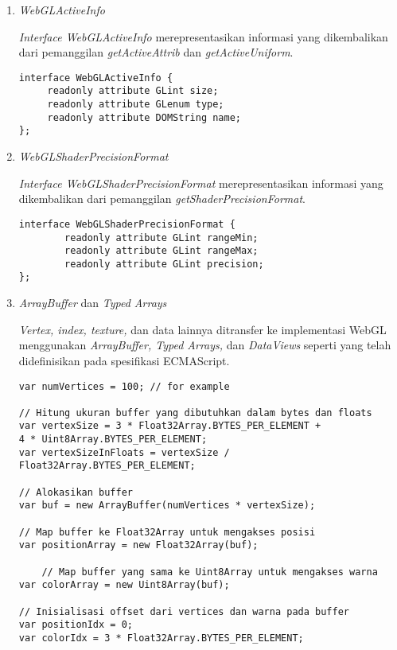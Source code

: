 \documentclass[a4paper,twoside]{article}
\begin{document}
\begin{enumerate}
\begin{enumerate}
\item {\it WebGLActiveInfo}

	{\it Interface WebGLActiveInfo} merepresentasikan informasi yang dikembalikan dari pemanggilan {\it getActiveAttrib} dan {\it getActiveUniform}.
	\begin{lstlisting}[caption={Keluaran dari  pemanggilan {\it getActiveAttrib} dan {\it getActiveUniform}.}, captionpos=b]
interface WebGLActiveInfo {
  	 readonly attribute GLint size;
   	 readonly attribute GLenum type;
	 readonly attribute DOMString name;
};
	\end{lstlisting}
	
\item {\it WebGLShaderPrecisionFormat}

	{\it Interface WebGLShaderPrecisionFormat} merepresentasikan informasi yang dikembalikan dari pemanggilan {\it getShaderPrecisionFormat}.
	\begin{lstlisting}[caption={Keluaran dari  pemanggilan {\it getShaderPrecisionFormat}.}, captionpos=b]
interface WebGLShaderPrecisionFormat {
    	readonly attribute GLint rangeMin;
    	readonly attribute GLint rangeMax;
    	readonly attribute GLint precision;
};
	\end{lstlisting}
	
\item {\it ArrayBuffer} dan {\it Typed Arrays}

	{\it Vertex, index, texture,} dan data lainnya ditransfer ke implementasi WebGL menggunakan {\it ArrayBuffer, Typed Arrays,} dan {\it DataViews} seperti yang telah didefinisikan pada spesifikasi ECMAScript.
\begin{lstlisting}[caption={Transfer data ke implementasi WebGL.}, captionpos=b]
var numVertices = 100; // for example

// Hitung ukuran buffer yang dibutuhkan dalam bytes dan floats
var vertexSize = 3 * Float32Array.BYTES_PER_ELEMENT +
4 * Uint8Array.BYTES_PER_ELEMENT;
var vertexSizeInFloats = vertexSize / Float32Array.BYTES_PER_ELEMENT;

// Alokasikan buffer
var buf = new ArrayBuffer(numVertices * vertexSize);

// Map buffer ke Float32Array untuk mengakses posisi
var positionArray = new Float32Array(buf);

	// Map buffer yang sama ke Uint8Array untuk mengakses warna
var colorArray = new Uint8Array(buf);

// Inisialisasi offset dari vertices dan warna pada buffer
var positionIdx = 0;
var colorIdx = 3 * Float32Array.BYTES_PER_ELEMENT;


\end{lstlisting}
\end{enumerate}
\end{enumerate}
\end{document}
